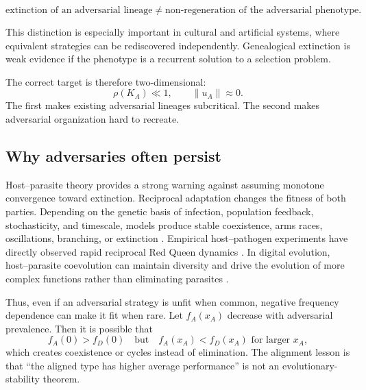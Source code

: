 \documentclass[11pt]{article}
\begin{document}
\begin{equation}
    \boxed{\text{extinction of an adversarial lineage}\neq\text{non-regeneration of the adversarial phenotype}.}
\end{equation}

This distinction is especially important in cultural and artificial systems, where equivalent strategies can be rediscovered independently. Genealogical extinction is weak evidence if the phenotype is a recurrent solution to a selection problem.

The correct target is therefore two-dimensional:
\begin{equation}
    \rho(K_A)\ll 1,
    \qquad
    \|u_A\|\approx 0.
    \label{eq:two-dimensional-target}
\end{equation}
The first makes existing adversarial lineages subcritical. The second makes adversarial organization hard to recreate.

\subsection{Why adversaries often persist}

Host--parasite theory provides a strong warning against assuming monotone convergence toward extinction. Reciprocal adaptation changes the fitness of both parties. Depending on the genetic basis of infection, population feedback, stochasticity, and timescale, models produce stable coexistence, arms races, oscillations, branching, or extinction \parencite{buckingham2022,ashby2019}. Empirical host--pathogen experiments have directly observed rapid reciprocal Red Queen dynamics \parencite{papkou2019}. In digital evolution, host--parasite coevolution can maintain diversity and drive the evolution of more complex functions rather than eliminating parasites \parencite{zaman2014}.

Thus, even if an adversarial strategy is unfit when common, negative frequency dependence can make it fit when rare. Let $f_A(x_A)$ decrease with adversarial prevalence. Then it is possible that
\begin{equation}
    f_A(0)>f_D(0)
    \quad\text{but}\quad
    f_A(x_A)<f_D(x_A)
    \text{ for larger }x_A,
\end{equation}
which creates coexistence or cycles instead of elimination. The alignment lesson is that ``the aligned type has higher average performance'' is not an evolutionary-stability theorem.
\end{document}
